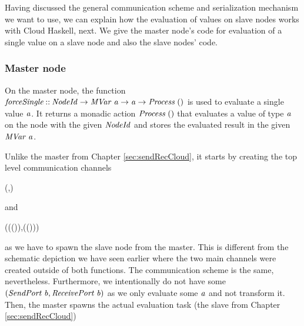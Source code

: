 \documentclass[paper=A4,twoside=true,openright,parskip=full,chapterprefix=true,headings=normal,bibliography=totoc,listof=totoc,titlepage=on,captions=tableabove,draft=false,british]{scrreprt}%
\begin{document}
\label{sec:cloudhaskellEvaluationOnSlaves}

Having discussed the general communication scheme and serialization
mechanism we want to use, we can explain how the evaluation of values on
slave nodes works with Cloud Haskell, next. We give the master node's
code for evaluation of a single value on a slave node and also the slave
nodes' code.

\hypertarget{master-node}{%
\subsubsection{Master node}\label{master-node}}

\label{sec:cloudhaskellparEvalMasterNode}

On the master node, the function
\ensuremath{\Varid{forceSingle}\mathbin{::}\Conid{NodeId}\to \Conid{MVar}\;\Varid{a}\to \Varid{a}\to \Conid{Process}\;()} is used to evaluate
a single value \ensuremath{\Varid{a}}. It returns a monadic action \ensuremath{\Conid{Process}\;()} that
evaluates a value of type \ensuremath{\Varid{a}} on the node with the given \ensuremath{\Conid{NodeId}} and
stores the evaluated result in the given \ensuremath{\Conid{MVar}\;\Varid{a}}.

Unlike the master from Chapter \ref{sec:sendRecCloud}, it starts by
creating the top level communication channels


\begin{hscode}\SaveRestoreHook
{}%
%
\>[B]{}(\;,\;){}\<[E]%
\ColumnHook
\end{hscode}\resethooks
\vspace{-2\baselineskip}

and


\begin{hscode}\SaveRestoreHook
{}%
%
\>[B]{}(\;(\;(\;)),\;(\;(\;))){}\<[E]%
\ColumnHook
\end{hscode}\resethooks
\vspace{-2\baselineskip}

as we have to spawn the slave node from the master. This is different
from the schematic depiction we have seen earlier where the two main
channels were created outside of both functions. The communication
scheme is the same, nevertheless. Furthermore, we intentionally do not
have some \ensuremath{(\Conid{SendPort}\;\Varid{b},\Conid{ReceivePort}\;\Varid{b})} as we only evaluate some \ensuremath{\Varid{a}} and
not transform it. Then, the master spawns the actual evaluation task
(the slave from Chapter \ref{sec:sendRecCloud})
\end{document}
